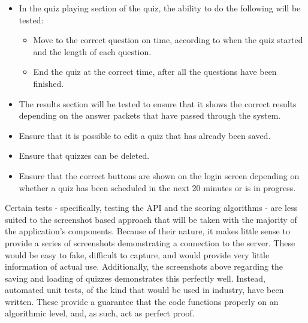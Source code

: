 \begin{itemize}
  \item In the quiz playing section of the quiz, the ability to do the following will be tested:
  \begin{itemize}
    \item Move to the correct question on time, according to when the quiz started and the length of each question.
    \item End the quiz at the correct time, after all the questions have been finished.
  \end{itemize}

  \item The results section will be tested to ensure that it shows the correct results depending on the answer packets that have passed through the system.

  \item Ensure that it is possible to edit a quiz that has already been saved.
  \item Ensure that quizzes can be deleted.
  \item Ensure that the correct buttons are shown on the login screen depending on whether a quiz has been scheduled in the next 20 minutes or is in progress.
\end{itemize}

Certain tests - specifically, testing the API and the scoring algorithms - are less suited to the screenshot based approach that will be taken with the majority of the application's components. Because of their nature, it makes little sense to provide a series of screenshots demonstrating a connection to the server. These would be easy to fake, difficult to capture, and would provide very little information of actual use. Additionally, the screenshots above regarding the saving and loading of quizzes demonstrates this perfectly well. Instead, automated unit tests, of the kind that would be used in industry, have been written. These provide a guarantee that the code functions properly on an algorithmic level, and, as such, act as perfect proof.
